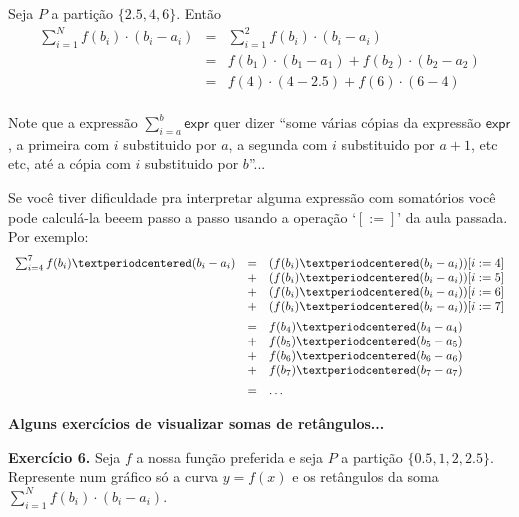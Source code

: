 \documentclass[oneside,12pt]{article}
\begin{document}
\msk

Seja $P$ a partição $\{2.5,4,6\}$. Então
%
$$\begin{array}{rcl}
  \sum_{i=1}^N f(b_i)·(b_i-a_i)
     &=& \sum_{i=1}^2 f(b_i)·(b_i-a_i) \\
     &=& f(b_1)·(b_1-a_1) + f(b_2)·(b_2-a_2) \\
     &=& f(4)·(4-2.5) + f(6)·(6-4) \\
  \end{array}
$$

\newpage


Note que a expressão $\sum_{i=a}^b \mathsf{expr}$ quer dizer ``some
várias cópias da expressão $\mathsf{expr}$, a primeira com $i$
substituido por $a$, a segunda com $i$ substituido por $a+1$, etc etc,
até a cópia com $i$ substituido por $b$''...

Se você tiver dificuldade pra interpretar alguma expressão com
somatórios você pode calculá-la beeem passo a passo usando a operação
`$[:=]$' da aula passada. Por exemplo:
%
$$\scalebox{0.90}{$
  \begin{array}{rcl}
  \sum_{i=4}^7 f(b_i)·(b_i-a_i)
     &=& (f(b_i)·(b_i-a_i))[i:=4] \\
     &+& (f(b_i)·(b_i-a_i))[i:=5] \\
     &+& (f(b_i)·(b_i-a_i))[i:=6] \\
     &+& (f(b_i)·(b_i-a_i))[i:=7] \\[5pt]
     &=&  f(b_4)·(b_4-a_4) \\
     &+&  f(b_5)·(b_5-a_5) \\
     &+&  f(b_6)·(b_6-a_6) \\
     &+&  f(b_7)·(b_7-a_7) \\[5pt]
     &=& \ldots \\
  \end{array}
  $}
$$



\newpage


{\bf Alguns exercícios de visualizar somas de retângulos...}

\ssk

{\bf Exercício 6.} Seja $f$ a nossa função preferida e seja $P$ a
partição $\{0.5,1,2,2.5\}$. Represente num gráfico só a curva $y=f(x)$
e os retângulos da soma $\sum_{i=1}^N f(b_i)·(b_i-a_i)$.
\end{document}
